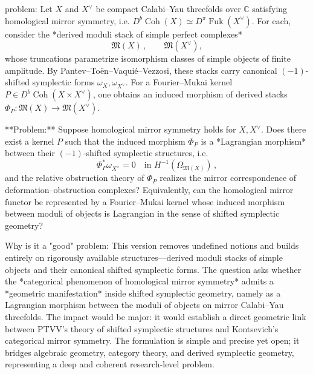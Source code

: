 problem:  
Let \( X \) and \( X^\vee \) be compact Calabi–Yau threefolds over \( \mathbb{C} \) satisfying homological mirror symmetry, i.e. \( D^b\!\operatorname{Coh}(X)\simeq D^\pi\!\operatorname{Fuk}(X^\vee) \).  
For each, consider the *derived moduli stack of simple perfect complexes*  
\[
\mathfrak{M}(X)\,,\qquad  \mathfrak{M}(X^\vee),
\]
whose truncations parametrize isomorphism classes of simple objects of finite amplitude.  
By Pantev–Toën–Vaquié–Vezzosi, these stacks carry canonical \((-1)\)-shifted symplectic forms \(\omega_X, \omega_{X^\vee}\).  For a Fourier–Mukai kernel \(P\in D^b\!\operatorname{Coh}(X\times X^\vee)\), one obtains an induced morphism of derived stacks \( \Phi_P:\mathfrak{M}(X)\to \mathfrak{M}(X^\vee)\).

**Problem:**  
Suppose homological mirror symmetry holds for \(X, X^\vee\).  Does there exist a kernel \(P\) such that the induced morphism \(\Phi_P\) is a *Lagrangian morphism* between their \((-1)\)-shifted symplectic structures, i.e.  
\[
\Phi_P^*\omega_{X^\vee} = 0 \quad \text{in } H^{-1}(\Omega_{\mathfrak{M}(X)})\,,  
\]
and the relative obstruction theory of \(\Phi_P\) realizes the mirror correspondence of deformation–obstruction complexes?  
Equivalently, can the homological mirror functor be represented by a Fourier–Mukai kernel whose induced morphism between moduli of objects is Lagrangian in the sense of shifted symplectic geometry?

Why is it a "good" problem:  
This version removes undefined notions and builds entirely on rigorously available structures—derived moduli stacks of simple objects and their canonical shifted symplectic forms.  The question asks whether the *categorical phenomenon of homological mirror symmetry* admits a *geometric manifestation* inside shifted symplectic geometry, namely as a Lagrangian morphism between the moduli of objects on mirror Calabi–Yau threefolds.  The impact would be major: it would establish a direct geometric link between PTVV’s theory of shifted symplectic structures and Kontsevich’s categorical mirror symmetry.  The formulation is simple and precise yet open; it bridges algebraic geometry, category theory, and derived symplectic geometry, representing a deep and coherent research‑level problem.